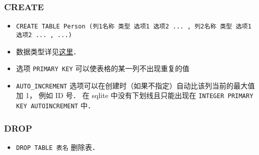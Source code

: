 \subsubsection{CREATE}
\begin{itemize}
\item \verb|CREATE TABLE Person (列1名称 类型 选项1 选项2 ... , 列2名称 类型 选项1 选项2 ... , ...)|
\item 数据类型详见\href{https://www.w3schools.com/sql/sql_datatypes.asp}{这里}．
\item 选项 \verb|PRIMARY KEY| 可以使表格的某一列不出现重复的值 %
\item \verb|AUTO_INCREMENT| 选项可以在创建时（如果不指定）自动比该列当前的最大值加 1， 例如 ID 号． 在 sqlite 中没有下划线且只能出现在 \verb|INTEGER PRIMARY KEY AUTOINCREMENT| 中．
\end{itemize}

\subsubsection{DROP}
\begin{itemize}
\item \verb|DROP TABLE 表名| 删除表．
\end{itemize}

